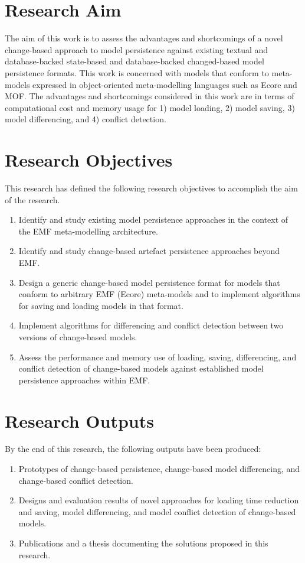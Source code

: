 \section{Research Aim}
\label{sec:research_aim}
The aim of this work is to assess the advantages and shortcomings of a novel change-based approach to model persistence against existing textual and database-backed state-based and database-backed changed-based model persistence formats. This work is concerned with models that conform to meta-models expressed in object-oriented meta-modelling languages such as Ecore and MOF. The advantages and shortcomings considered in this work are in terms of computational cost and memory usage for 1) model loading, 2) model saving, 3) model differencing, and 4) conflict detection.

\section{Research Objectives}
\label{sec:research_objectives}
This research has defined the following research objectives to accomplish the aim of the research.
\begin{enumerate}
  \item Identify and study existing model persistence approaches in the context of the EMF meta-modelling architecture.
  \item Identify and study change-based artefact persistence approaches beyond EMF.
  \item Design a generic change-based model persistence format for models that conform to arbitrary EMF (Ecore) meta-models and to implement algorithms for saving and loading models in that format.
  \item Implement algorithms for differencing and conflict detection between two versions of change-based models.
  \item Assess the performance and memory use of loading, saving, differencing, and conflict detection of change-based models against established model persistence approaches within EMF.
\end{enumerate}

\section{Research Outputs}
\label{sec:research_outputs}
By the end of this research, the following outputs have been produced:
\begin{enumerate}
  \item Prototypes of change-based persistence, change-based model differencing, and change-based conflict detection.
  \item Designs and evaluation results of novel approaches for loading time reduction and saving, model differencing, and model conflict detection of change-based models.
  \item Publications \cite{DBLP:conf/models/YohannisKP17,yohannis2018towards,DBLP:conf/models/YohannisRPK18,yohannis2019efficient} and a thesis documenting the solutions proposed in this research.
\end{enumerate}

